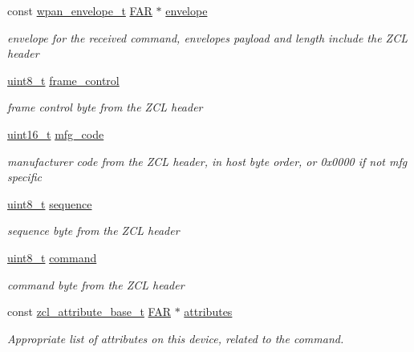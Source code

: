 \begin{DoxyCompactItemize}
\item 
const \hyperlink{structwpan__envelope__t}{wpan\+\_\+envelope\+\_\+t} \hyperlink{group__hal_gaef060b3456fdcc093a7210a762d5f2ed}{F\+AR} $\ast$ \hyperlink{group__zcl_ga1c24c7848d60bc6aa335a8ba9fd14b7a}{envelope}
\begin{DoxyCompactList}\small\item\em envelope for the received command, envelope\textquotesingle{}s payload and length include the Z\+CL header \end{DoxyCompactList}\item 
\hyperlink{group__hal__dos_gae1affc9ca37cfb624959c866a73f83c2}{uint8\+\_\+t} \hyperlink{group__zcl_ga5226462a41663bc81a5d67c04f18868a}{frame\+\_\+control}
\begin{DoxyCompactList}\small\item\em frame control byte from the Z\+CL header \end{DoxyCompactList}\item 
\hyperlink{group__hal__dos_ga5a8b2dc9e45a9ee81a94ef304fb62505}{uint16\+\_\+t} \hyperlink{group__zcl_ga011fb17c1112658806badaccba7a246d}{mfg\+\_\+code}
\begin{DoxyCompactList}\small\item\em manufacturer code from the Z\+CL header, in host byte order, or 0x0000 if not mfg specific \end{DoxyCompactList}\item 
\hyperlink{group__hal__dos_gae1affc9ca37cfb624959c866a73f83c2}{uint8\+\_\+t} \hyperlink{group__zcl_gacb5c8866a58116314f6c8eda9dc3544c}{sequence}
\begin{DoxyCompactList}\small\item\em sequence byte from the Z\+CL header \end{DoxyCompactList}\item 
\hyperlink{group__hal__dos_gae1affc9ca37cfb624959c866a73f83c2}{uint8\+\_\+t} \hyperlink{group__zcl_ga1a5aaa930940857f68f245eeb89506b5}{command}
\begin{DoxyCompactList}\small\item\em command byte from the Z\+CL header \end{DoxyCompactList}\item 
const \hyperlink{structzcl__attribute__base__t}{zcl\+\_\+attribute\+\_\+base\+\_\+t} \hyperlink{group__hal_gaef060b3456fdcc093a7210a762d5f2ed}{F\+AR} $\ast$ \hyperlink{group__zcl_ga04c31df34f50e8dd1efaf1105631b2bc}{attributes}
\begin{DoxyCompactList}\small\item\em Appropriate list of attributes on this device, related to the command. \end{DoxyCompactList}\item 

\end{DoxyCompactItemize}
